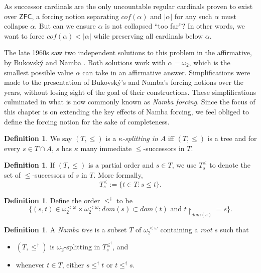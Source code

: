 \documentclass[12pt, twoside]{memoir}
\numberwithin{equation}{section}
\theoremstyle{definition}
\newtheorem{defi}[thm]{Definition}
\theoremstyle{remark}
\theoremstyle{definition}
\theoremstyle{definition}
\theoremstyle{definition}
\theoremstyle{remark}
\begin{document}
As successor cardinals are the only uncountable regular cardinals proven to exist over $\mathsf{ZFC}$, a forcing notion separating $cof(\alpha)$ and $|\alpha|$ for any such $\alpha$ must collapse $\alpha$. But can we ensure $\alpha$ is not collapsed ``too far''? In other words, we want to force $cof(\alpha) < |\alpha|$ while preserving all cardinals below $\alpha$.

The late 1960s saw two independent solutions to this problem in the affirmative, by Bukovsk\'{y} \cite{bukovsky} and Namba \cite{namba}. Both solutions work with $\alpha = \omega_2$, which is the smallest possible value $\alpha$ can take in an affirmative answer. Simplifications were made to the presentation of Bukovsk\'{y}'s and Namba's forcing notions over the years, without losing sight of the goal of their constructions. These simplifications culminated in what is now commonly known as \emph{Namba forcing}. Since the focus of this chapter is on extending the key effects of Namba forcing, we feel obliged to define the forcing notion for the sake of completeness.

\begin{defi}
We say $(T, \leq)$ is a $\kappa$\emph{-splitting in} $A$ iff $(T, \leq)$ is a tree and for every $s \in T \cap A$, $s$ has $\kappa$ many immediate $\leq$-successors in $T$. 
\end{defi}

\begin{defi}
If $(T, \leq)$ is a partial order and $s \in T$, we use $T_s^{\leq}$ to denote the set of $\leq$-successors of $s$ in $T$. More formally, $$T_s^{\leq} := \{t \in T : s \leq t\}.$$ 
\end{defi}

\begin{defi}
Define the order $\leq^{\dagger}$ to be $$\{(s, t) \in \omega_2^{< \omega} \times \omega_2^{< \omega} : dom(s) \subset dom(t) \text{ and } t \! \restriction_{dom(s)} = s\}.$$
\end{defi}

\begin{defi}
A \emph{Namba tree} is a subset $T$ of $\omega_2^{< \omega}$ containing a \emph{root} $s$ such that
\begin{itemize}
    \item $(T, \leq^{\dagger})$ is $\omega_2$-splitting in $T_s^{\leq^{\dagger}}$, and
    \item whenever $t \in T$, either $s \leq^{\dagger} t$ or $t \leq^{\dagger} s$. 
\end{itemize}
\end{defi}
\end{document}
